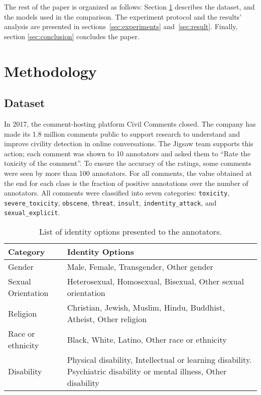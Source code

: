 \documentclass[a4paper,english]{rnti}
\begin{document}
The rest of the paper is organized as follows: Section \ref{sec:methodology} describes the dataset, and the models used in the comparison. The experiment protocol and the results' analysis are presented in sections~\ref{sec:experiments} and~\ref{sec:result}. Finally, section \ref{sec:conclusion} concludes the paper.

\section{Methodology}
\label{sec:methodology}

\subsection{Dataset}

In 2017, the comment-hosting platform Civil Comments closed. The company has made its 1.8 million comments public to support  research to understand and improve civility detection in online conversations. The Jigsaw team  supports this action; each comment was shown to 10 annotators and asked them to “Rate the toxicity of the comment”. To ensure the accuracy of the ratings, some comments were seen by more than 100 annotators. For all comments, the value obtained at the end for each class is the fraction of positive annotations over the number of annotators. All comments were classified into seven categories: \texttt{toxicity}, \texttt{severe\_toxicity}, \texttt{obscene}, \texttt{threat}, \texttt{insult}, \texttt{indentity\_attack}, and \texttt{sexual\_explicit}.

\begin{table}[ht]
\centering
{
\footnotesize
\begin{tabular}{lp{4cm}}
\hline
{\bf Category} & {\bf Identity Options}\\\hline
Gender & Male, Female, Transgender, Other gender \\\hline
Sexual Orientation & Heterosexual, Homosexual, Bisexual, Other sexual orientation \\\hline
Religion & Christian, Jewish, Muslim, Hindu, Buddhist, Atheist, Other religion \\\hline
Race or ethnicity & Black, White, Latino, Other race or ethnicity\\\hline
Disability & Physical disability, Intellectual or learning disability. Psychiatric disability or mental illness, Other disability\\\hline
\end{tabular}
}
\caption{List of identity options presented to the annotators.}
\label{tab:listidentity}
\end{table}
\end{document}
